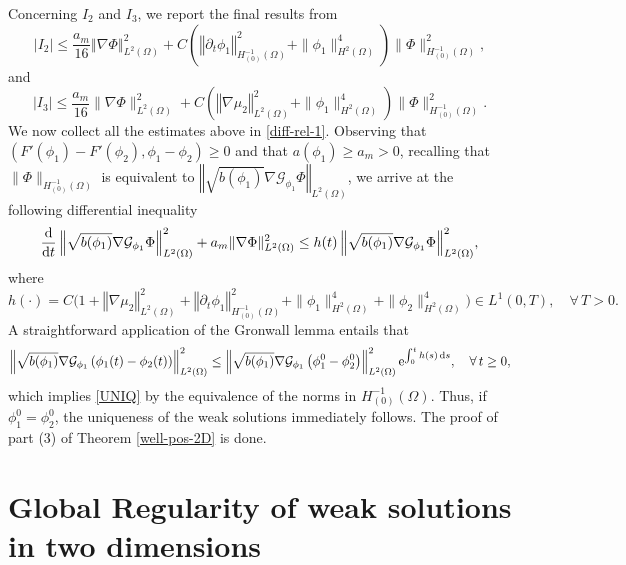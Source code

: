 \documentclass[11pt,reqno]{amsart}
\theoremstyle{remark}
\newcommand \norm[1] {\left\Vert #1\right\Vert}
\def\G{\mathcal{G}}
\def\d{{\rm d}}
\def\ddt{\frac{\d}{\d t}}
\numberwithin{equation}{section}
\def\d{{\rm d}}
\begin{document}
Concerning $I_2$ and $I_3$, we report the final results from \cite[Eqns. (3.50) and (3.51)]{CGGG2025} 
\begin{equation*}
\label{I2-f}
|I_2| \leq \frac{a_m}{16}  \norm{\nabla \Phi}_{L^2(\Omega)}^2
 + C \left( \norm{\partial_t \phi_1}_{ H^{-1}_{(0)}(\Omega)}^2 +
 \| \phi_1\|_{H^2(\Omega)}^4\right)
\|\Phi\|_{H^{-1}_{(0)}(\Omega)}^{2}\!,
\end{equation*}
and
\begin{equation*}
\label{I3-f}
|I_3| \leq \frac{a_m}{16}  \| \nabla \Phi\|_{L^2(\Omega)}^2
 + C  \left( \norm{\nabla \mu_2}_{L^2(\Omega)}^2+
 \| \phi_1\|_{H^2(\Omega)}^4
   \right) \|\Phi\|_{H^{-1}_{(0)}(\Omega)}^{2}\!.
\end{equation*}
We now collect all the estimates above in \eqref{diff-rel-1}.  Observing that $(F'(\phi_1)-F'(\phi_2), \phi_1-\phi_2) \geq 0$  and that $a(\phi_1)\geq a_m>0$, recalling that
$\|\Phi\|_{H^{-1}_{(0)}(\Omega)}$ is equivalent to $\norm{\sqrt{b(\phi_1)} \nabla \G_{\phi_1} \Phi}_{L^2(\Omega)}$, we arrive at the following differential inequality
\begin{equation}
\label{diff-rel-2}
\ddt  \norm{\sqrt{b(\phi_1)}\nabla \G_{\phi_1} \Phi}_{L^2(\Omega)}^2
+ a_m\|\nabla \Phi \|_{L^2(\Omega)}^2
\leq h(t) \norm{ \sqrt{b(\phi_1)} \nabla \G_{\phi_1} \Phi}_{L^2(\Omega)}^2
\! ,
\end{equation}
where
$$
h(\cdot)= C \Big( 1+
\norm{\nabla \mu_2}_{L^2(\Omega)}^2
+ \norm{\partial_t \phi_1}_{ H^{-1}_{(0)}(\Omega)}^2 +
 \| \phi_1\|_{H^2(\Omega)}^4+
 \| \phi_2\|_{H^2(\Omega)}^4  \Big) \in L^1(0,T), \quad \forall \, T>0.
$$
A straightforward application of the Gronwall lemma entails that
\begin{equation}
\norm{\sqrt{b(\phi_1)} \nabla \G_{\phi_1}\left( \phi_1(t)-\phi_2(t) \right)}_{L^2(\Omega)}^2
\leq \norm{\sqrt{b(\phi_1)} \nabla \G_{\phi_1} \left( \phi_1^0-\phi_2^0 \right)}_{L^2(\Omega)}^2
\mathrm{e}^{\int_0^t h(s)\, \d s}, \quad \forall \, t \geq 0,
\end{equation}
which implies \eqref{UNIQ} by the equivalence of the norms in $H^{-1}_{(0)}(\Omega)$. Thus, if $\phi_1^0=\phi_2^0$, the  uniqueness of the weak solutions immediately follows. The proof of part (3) of Theorem \ref{well-pos-2D} is done.

\section{Global Regularity of weak solutions in two dimensions}
\label{S-Strong}
\end{document}
